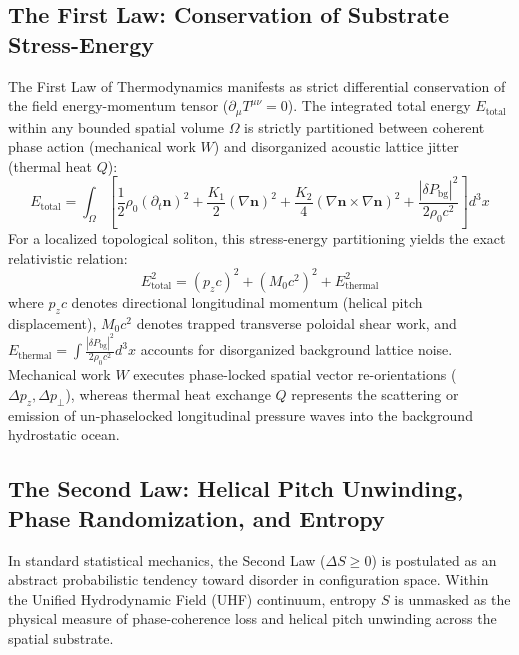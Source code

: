 \documentclass[11pt,a4paper]{article}
\begin{document}
	\subsection{The First Law: Conservation of Substrate Stress-Energy}
	The First Law of Thermodynamics manifests as strict differential conservation of the field energy-momentum tensor ($\partial_\mu T^{\mu\nu} = 0$). The integrated total energy $E_{\text{total}}$ within any bounded spatial volume $\Omega$ is strictly partitioned between coherent phase action (mechanical work $W$) and disorganized acoustic lattice jitter (thermal heat $Q$):
	\begin{equation}
		E_{\text{total}} = \int_{\Omega} \left[ \frac{1}{2} \rho_0 (\partial_t \mathbf{n})^2 + \frac{K_1}{2} (\nabla \mathbf{n})^2 + \frac{K_2}{4} (\nabla \mathbf{n} \times \nabla \mathbf{n})^2 + \frac{|\delta P_{\text{bg}}|^2}{2 \rho_0 c^2} \right] d^3x
	\end{equation}
	For a localized topological soliton, this stress-energy partitioning yields the exact relativistic relation:
	\begin{equation}
		E_{\text{total}}^2 = (p_z c)^2 + (M_0 c^2)^2 + E_{\text{thermal}}^2
	\end{equation}
	where $p_z c$ denotes directional longitudinal momentum (helical pitch displacement), $M_0 c^2$ denotes trapped transverse poloidal shear work, and $E_{\text{thermal}} = \int \frac{|\delta P_{\text{bg}}|^2}{2 \rho_0 c^2} d^3x$ accounts for disorganized background lattice noise. Mechanical work $W$ executes phase-locked spatial vector re-orientations ($\Delta p_z, \Delta p_\perp$), whereas thermal heat exchange $Q$ represents the scattering or emission of un-phaselocked longitudinal pressure waves into the background hydrostatic ocean.
	
	\subsection{The Second Law: Helical Pitch Unwinding, Phase Randomization, and Entropy}
	In standard statistical mechanics, the Second Law ($\Delta S \ge 0$) is postulated as an abstract probabilistic tendency toward disorder in configuration space. Within the Unified Hydrodynamic Field (UHF) continuum, entropy $S$ is unmasked as the physical measure of phase-coherence loss and helical pitch unwinding across the spatial substrate.
	
\end{document}
